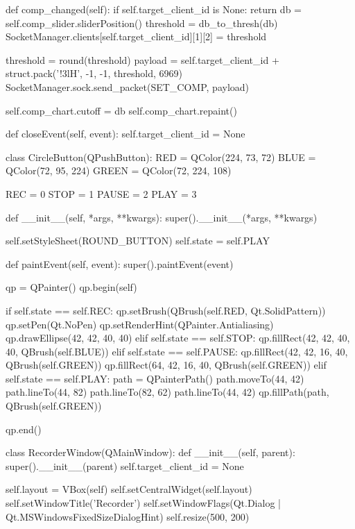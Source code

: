 \begin{pythoncode}
    def comp_changed(self):
        if self.target_client_id is None:
            return
        db = self.comp_slider.sliderPosition()
        threshold = db_to_thresh(db)
        SocketManager.clients[self.target_client_id][1][2] = threshold

        threshold = round(threshold)
        payload = self.target_client_id + struct.pack('!3lH', -1, -1, threshold, 6969)
        SocketManager.sock.send_packet(SET_COMP, payload)

        self.comp_chart.cutoff = db
        self.comp_chart.repaint()

    def closeEvent(self, event):
        self.target_client_id = None


class CircleButton(QPushButton):
    RED = QColor(224, 73, 72)
    BLUE = QColor(72, 95, 224)
    GREEN = QColor(72, 224, 108)

    REC = 0
    STOP = 1
    PAUSE = 2
    PLAY = 3

    def __init__(self, *args, **kwargs):
        super().__init__(*args, **kwargs)

        self.setStyleSheet(ROUND_BUTTON)
        self.state = self.PLAY
    
    def paintEvent(self, event):
        super().paintEvent(event)

        qp = QPainter()
        qp.begin(self)

        if self.state == self.REC:
            qp.setBrush(QBrush(self.RED, Qt.SolidPattern))
            qp.setPen(Qt.NoPen)
            qp.setRenderHint(QPainter.Antialiasing)
            qp.drawEllipse(42, 42, 40, 40)
        elif self.state == self.STOP:
            qp.fillRect(42, 42, 40, 40, QBrush(self.BLUE))
        elif self.state == self.PAUSE:
            qp.fillRect(42, 42, 16, 40, QBrush(self.GREEN))
            qp.fillRect(64, 42, 16, 40, QBrush(self.GREEN))
        elif self.state == self.PLAY:
            path = QPainterPath()
            path.moveTo(44, 42)
            path.lineTo(44, 82)
            path.lineTo(82, 62)
            path.lineTo(44, 42)
            qp.fillPath(path, QBrush(self.GREEN))

        qp.end()


class RecorderWindow(QMainWindow):
    def __init__(self, parent):
        super().__init__(parent)
        self.target_client_id = None

        self.layout = VBox(self)
        self.setCentralWidget(self.layout)
        self.setWindowTitle('Recorder')
        self.setWindowFlags(Qt.Dialog | Qt.MSWindowsFixedSizeDialogHint)
        self.resize(500, 200)


\end{pythoncode}
